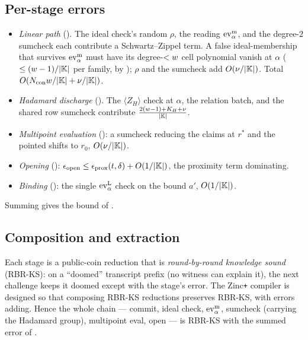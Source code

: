 \subsection{Per-stage errors}
\label{sec:per-stage}

\begin{itemize}[leftmargin=2em]
  \item \emph{Linear path}
    (). The ideal check's
    random $\rho$, the reading $\operatorname{ev}^{\mathrm{m}}_{\alpha}$, and the degree-$2$ sumcheck each
    contribute a Schwartz--Zippel term. A false ideal-membership that survives
    $\operatorname{ev}^{\mathrm{m}}_{\alpha}$ must have its degree-$<w$ cell polynomial vanish at $\alpha$
    ($\le(w-1)/|\mathbb{K}|$ per family, by ); $\rho$ and
    the sumcheck add $O(\nu/|\mathbb{K}|)$. Total
    $O(N_{\mathrm{con}}w/|\mathbb{K}| + \nu/|\mathbb{K}|)$.
  \item \emph{Hadamard discharge} (). The
    $\langle Z_H\rangle$ check at $\alpha$, the relation batch, and the shared
    row sumcheck contribute $\frac{2(w-1)+K_H+\nu}{|\mathbb{K}|}$.
  \item \emph{Multipoint evaluation} (): a sumcheck reducing
    the claims at $r^*$ and the pointed shifts to $r_0$, $O(\nu/|\mathbb{K}|)$.
  \item \emph{Opening} ():
    $\epsilon_{\mathrm{open}}\le\epsilon_{\mathrm{prox}}(t,\delta)+O(1/|\mathbb{K}|)$,
    the proximity term dominating.
  \item \emph{Binding} (): the single $\operatorname{ev}^{\mathrm{L}}_{\alpha}$ check on the
    bound $a'$, $O(1/|\mathbb{K}|)$.
\end{itemize}
Summing gives the bound of .

\subsection{Composition and extraction}
\label{sec:composition}

Each stage is a public-coin reduction that is \emph{round-by-round knowledge
sound} (RBR-KS): on a ``doomed'' transcript prefix (no witness can explain it),
the next challenge keeps it doomed except with the stage's error. The
Zinc\texttt{+} compiler is designed so that composing RBR-KS reductions preserves
RBR-KS, with errors adding. Hence the whole chain --- commit, ideal check,
$\operatorname{ev}^{\mathrm{m}}_{\alpha}$, sumcheck (carrying the Hadamard group), multipoint eval, open --- is
RBR-KS with the summed error of .

